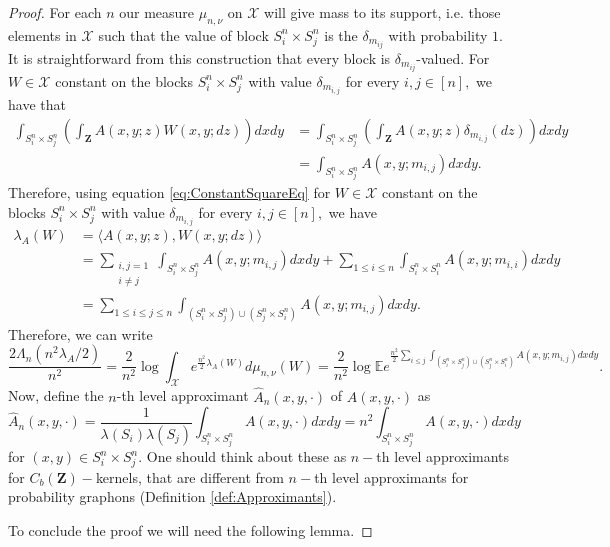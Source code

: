 \documentclass[12pt,twoside,a4paper]{article}
\def\E{\mathbb{E}}
\newcommand{\Square}{{S^n_i\times S^n_j}}
\newcommand{\SquareDiagI}{{S^n_i\times S^n_i}}
\newcommand{\SquareUnion}{{(S^n_i\times S^n_j)\cup (S^n_j\times S^n_i)}}
\newcommand{\Space}{\mathbf{Z}}
\newcommand{\CbFunct}{C_b(\Space)}
\newcommand{\lep}{\left(}
\newcommand{\rip}{\right)}
\begin{document}
\begin{proof}
For each $n$ our measure $\mu_{n,\nu}$ on $\mathcal{X}$ will give mass to its support, i.e. those elements in $\mathcal{X}$ such that the value of block $\Square$ is the $\delta_{m_{ij}}$ with probability $1$. It is straightforward from this construction that every block is $\delta_{m_{ij}}$-valued.
For $W\in \mathcal{X}$ constant on the blocks $\Square$ with value $\delta_{m_{i,j}}$ for every $i,j\in [n],$ we have that
\begin{equation}\label{eq:ConstantSquareEq}
\begin{aligned}
\int_{\Square}\lep\int_{\Space}A(x,y;z)W(x,y;dz)\rip dx dy&=\int_{\Square}\lep\int_{\Space} A(x,y;z)\delta_{m_{i,j}}(dz)\rip dx dy\\
&=\int_{\Square}A(x,y;m_{i,j}) dx dy.
\end{aligned}
\end{equation}
Therefore, using equation \eqref{eq:ConstantSquareEq} for $W\in \mathcal{X}$ constant on the blocks $\Square$ with value $\delta_{m_{i,j}}$ for every $i,j\in [n],$ we have 
\begin{align*}
  \lambda_A( W)&=\langle A(x,y;z),W(x,y;dz)\rangle\\
&=\sum_{\substack{i,j=1\\
i\neq j}}\int_{\Square}A(x,y;m_{i,j}) dx dy +\sum_{1\leq i\leq n}\int_{\SquareDiagI} A(x,y;m_{i,i}) dx dy
\\&=\sum_{1\leq i\leq j\leq n}\int_{\SquareUnion}A(x,y;m_{i,j}) dx dy .
\end{align*}
Therefore, we can write
\[
{\frac{2 \Lambda_n(n^2\lambda_A/2)}{n^2}}=\frac{2}{n^2}\log \int_{\mathcal{X}} e^{\frac{n^2}{2}\lambda_A( W)}d\mu_{n,\nu}( W)=\frac{2}{n^2}\log \E e^{\frac{n^2}{2}\sum_{i\leq j}\int_{\SquareUnion}A(x,y;m_{i,j}) dx dy}.
\]
Now, define the $n$-th level approximant $\widehat{A}_n(x,y,\cdot)$ of $A(x,y,\cdot)$ as 
\[
\widehat{A}_n(x,y,\cdot)=\frac{1}{\lambda(S_i)\lambda(S_j)}\int_{\Square}A(x,y,\cdot)dxdy=n^2\int_{\Square}A(x,y,\cdot)dxdy
\]
for $(x,y)\in \Square.$ One should think about these as $n-$th level approximants for $\CbFunct-$kernels, that are different from $n-$th level approximants for probability graphons (Definition \ref{def:Approximants}).

To conclude the proof we will need the following lemma.


\end{proof}
\end{document}
